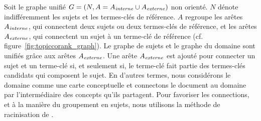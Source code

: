         Soit le graphe unifié $G = (N, A = A_{\textnormal{\textit{interne}}}
        \cup A_{\textnormal{\textit{externe}}})$ non orienté. $N$ dénote
        indifféremment les sujets et les termes-clés de référence. $A$ regroupe
        les arêtes $A_{\textnormal{\textit{interne}}}$, qui connectent deux
        sujets ou deux termes-clés de référence, et les arêtes
        $A_{\textnormal{\textit{externe}}}$, qui connectent un sujet à un
        terme-clé de référence (cf. figure~\ref{fig:topiccorank_graph}). Le
        graphe de sujets et le graphe du domaine sont unifiés grâce aux arêtes
        $A_{\textnormal{\textit{externe}}}$. Une arête
        $A_{\textnormal{\textit{externe}}}$ est ajouté pour connecter un sujet
        et un terme-clé si, et seulement si, le terme-clé fait partie des
        termes-clés candidats qui composent le sujet. En d'autres termes, nous
        considérons le domaine comme une carte conceptuelle et connectons le
        document au domaine par l'intermédiaire des concepts qu'ils partagent.
        Pour favoriser les connections, et à la manière du groupement en sujets,
        nous utilisons la méthode de racinisation de
        .
